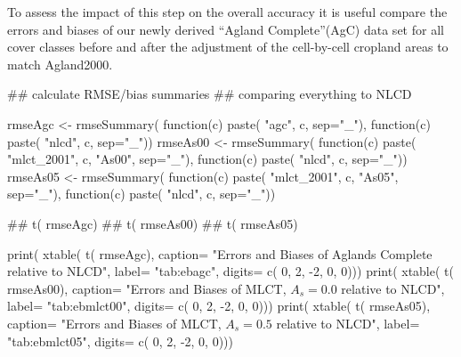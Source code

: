 

To assess the impact of this step on the overall accuracy it is useful
compare the errors and biases of our newly derived ``Agland
Complete''(AgC) data set for all cover classes before and after the
adjustment of the cell-by-cell cropland areas to match Agland2000.





 

\begin{Schunk}
\begin{Sinput}
 ## calculate RMSE/bias summaries
 ## comparing everything to NLCD
 
 
 rmseAgc <- rmseSummary( function(c) paste(  "agc", c, sep="_"),
                        function(c) paste( "nlcd", c, sep="_"))
 rmseAs00 <- rmseSummary( function(c) paste( "mlct_2001", c, "As00", sep="_"),
                         function(c) paste( "nlcd", c, sep="_"))
 rmseAs05 <- rmseSummary( function(c) paste( "mlct_2001", c, "As05", sep="_"),
                         function(c) paste( "nlcd", c, sep="_"))
\end{Sinput}
\end{Schunk}

\begin{Schunk}
\begin{Sinput}
 ## t( rmseAgc)
 ## t( rmseAs00)
 ## t( rmseAs05)
 
 print( xtable( t( rmseAgc), 
               caption= "Errors and Biases of Aglands Complete relative to NLCD",
               label= "tab:ebagc",
               digits= c( 0, 2, -2, 0, 0)))
 print( xtable( t( rmseAs00), 
               caption= "Errors and Biases of MLCT, $A_s = 0.0$ relative to NLCD",
               label= "tab:ebmlct00",
               digits= c( 0, 2, -2, 0, 0)))
 print( xtable( t( rmseAs05), 
               caption= "Errors and Biases of MLCT, $A_s = 0.5$ relative to NLCD",
               label= "tab:ebmlct05",
               digits= c( 0, 2, -2, 0, 0)))
\end{Sinput}
\end{Schunk}

